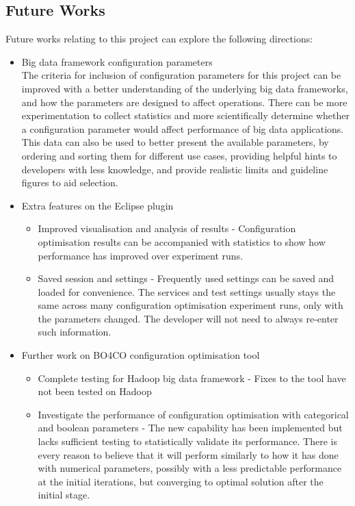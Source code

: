 \subsection{Future Works}
Future works relating to this project can explore the following directions:
\begin{itemize}
\item Big data framework configuration parameters\\
The criteria for inclusion of configuration parameters for this project can be improved with a better understanding of the underlying big data frameworks, and how the parameters are designed to affect operations. There can be more experimentation to collect statistics and more scientifically determine whether a configuration parameter would affect performance of big data applications. This data can also be used to better present the available parameters, by ordering and sorting them for different use cases, providing helpful hints to developers with less knowledge, and provide realistic limits and guideline figures to aid selection.
\item Extra features on the Eclipse plugin\\
	\begin{itemize}
    \item Improved visualisation and analysis of results - Configuration optimisation results can be accompanied with statistics to show how performance has improved over experiment runs.
	\item Saved session and settings - Frequently used settings can be saved and loaded for convenience. The services and test settings usually stays the same across many configuration optimisation experiment runs, only with the parameters changed. The developer will not need to always re-enter such information.
	\end{itemize}
\item Further work on BO4CO configuration optimisation tool\\
	\begin{itemize}
	\item Complete testing for Hadoop big data framework - Fixes to the tool have not been tested on Hadoop
    \item Investigate the performance of configuration optimisation with categorical and boolean parameters - The new capability has been implemented but lacks sufficient testing to statistically validate its performance. There is every reason to believe that it will perform similarly to how it has done with numerical parameters, possibly with a less predictable performance at the initial iterations, but converging to optimal solution after the initial stage.
	\end{itemize}
\end{itemize}
\newpage
